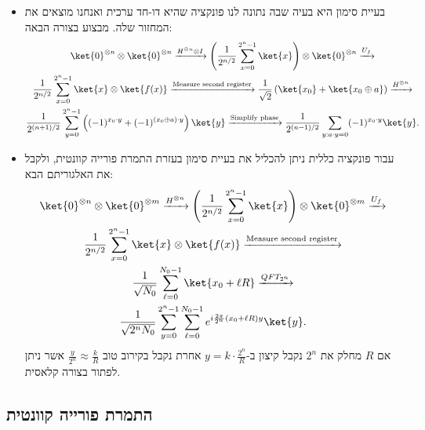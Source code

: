 \documentclass{tstextbook}
\begin{document}
\begin{summary}
  \begin{itemize}
    \item בעיית סימון היא בעיה שבה נתונה לנו פונקציה שהיא דו-חד ערכית ואנחנו מוצאים את המחזור שלה. מבצוע בצורה הבאה:
$$\begin{gather}\ket{0}^{\otimes n} \otimes \ket{0}^{\otimes n} \xrightarrow{H^{\otimes n} \otimes I} \left( \frac{1}{2^{n/2}} \sum_{x=0}^{2^n - 1} \ket{x} \right) \otimes \ket{0}^{\otimes n} \xrightarrow{U_f}  \\\frac{1}{2^{n/2}} \sum_{x=0}^{2^n - 1} \ket{x} \otimes \ket{f(x)} \xrightarrow{\text{Measure second register}} \frac{1}{\sqrt{2}} \left( \ket{x_0} + \ket{x_0 \oplus a} \right) \xrightarrow{H^{\otimes n}}  \\\frac{1}{2^{(n+1)/2}} \sum_{y=0}^{2^n - 1} \left( (-1)^{x_0 \cdot y} + (-1)^{(x_0 \oplus a) \cdot y} \right) \ket{y} \xrightarrow{\text{Simplify phase}} \frac{1}{2^{(n-1)/2}} \sum_{y: a \cdot y = 0} (-1)^{x_0 \cdot y} \ket{y}.
\end{gather}$$
    \item עבור פונקציה כללית ניתן להכליל את בעיית סימון בעזרת התמרת פורייה קוונטית, ולקבל את האלגוריתם הבא:
$$\begin{gather}\ket{0}^{\otimes n} \otimes \ket{0}^{\otimes m}  \xrightarrow{H^{\otimes n}}   \left( \frac{1}{2^{n/2}} \sum_{x=0}^{2^n - 1} \ket{x} \right) \otimes \ket{0}^{\otimes m}  \xrightarrow{U_f}  \\ \frac{1}{2^{n/2}} \sum_{x=0}^{2^n - 1} \ket{x} \otimes \ket{f(x)}  \xrightarrow{\text{Measure second register}}  \\ \frac{1}{\sqrt{N_0}} \sum_{\ell=0}^{N_0 - 1} \ket{x_0 + \ell R}  \xrightarrow{QFT_{2^n}}  \\ \frac{1}{\sqrt{2^n N_0}} \sum_{y=0}^{2^n - 1} \sum_{\ell=0}^{N_0 - 1} e^{i \frac{2\pi}{2^n} (x_0 + \ell R) y} \ket{y}. 
\end{gather}$$
אם \(R\) מחלק את \(2^{n}\) נקבל קיצון ב-\(y=k\cdot \frac{2^{n}}{R}\) אחרת נקבל בקירוב טוב \(\frac{y}{2^{n}}\approx \frac{k}{R}\) אשר ניתן לפתור בצורה קלאסית.
  \end{itemize}
\end{summary}
\subsection{התמרת פורייה קוונטית}
\end{document}
